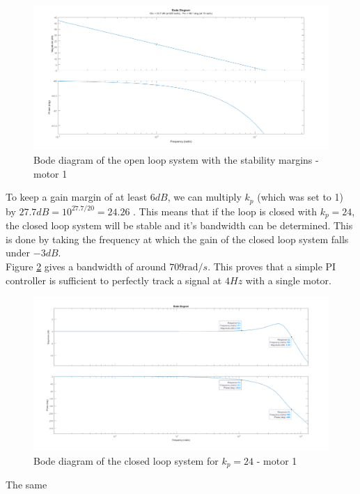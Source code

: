 \begin{figure}[H]
    \centering
    \includegraphics[width=\textwidth]{Pictures/bode_OL.png}
    \caption{Bode diagram of the open loop system with the stability margins - motor 1}
    \label{fig:OL bode}
\end{figure}

To keep a gain margin of at least $6 dB$, we can multiply $k_p$ (which was set to 1) by $27.7 dB = 10^{27.7/20} = 24.26$
. This means that if the loop is closed with $k_p = 24$, the closed loop system will be stable and it's bandwidth can
be determined. This is done by taking the frequency at which the gain of the closed loop system falls under $-3 dB$.\\ 
Figure \ref{fig:CL bode} gives a bandwidth of around $709 \text{rad}/s$.  This proves that a simple PI controller is 
sufficient to perfectly track a signal at $4 Hz$ with a single motor.

\begin{figure}[H]
    \centering
    \includegraphics[width=\textwidth]{Pictures/bode_CL.png}
    \caption{Bode diagram of the closed loop system for $k_p = 24$ - motor 1}
    \label{fig:CL bode}
\end{figure}

The same 



